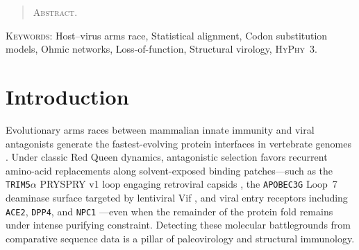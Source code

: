 \documentclass[11pt,letterpaper]{article}
\newcommand{\HyPhyThree}{\textsc{HyPhy~3}\xspace}
\renewenvironment{abstract}{\begin{quote}\small\noindent\textsc{Abstract.}\ }{\end{quote}}
\begin{document}
\begin{abstract}
\end{abstract}

\noindent\small \textsc{Keywords:} Host--virus arms race, Statistical alignment, Codon substitution models, Ohmic networks, Loss-of-function, Structural virology, \HyPhyThree.\normalsize\par
\smallskip
\headerrule

\section{Introduction}

Evolutionary arms races between mammalian innate immunity and viral antagonists generate the fastest-evolving protein interfaces in vertebrate genomes \citep{daugherty2012rules,enard2016viruses}. Under classic Red Queen dynamics, antagonistic selection favors recurrent amino-acid replacements along solvent-exposed binding patches---such as the \texttt{TRIM5}$\alpha$ PRYSPRY v1 loop engaging retroviral capsids \citep{sawyer2005positive,tenthorey2020mutational}, the \texttt{APOBEC3G} Loop~7 deaminase surface targeted by lentiviral Vif \citep{li2023a3g}, and viral entry receptors including \texttt{ACE2}, \texttt{DPP4}, and \texttt{NPC1} \citep{chan2020engineering,wang2013dpp4,ng2015filovirus}---even when the remainder of the protein fold remains under intense purifying constraint. Detecting these molecular battlegrounds from comparative sequence data is a pillar of paleovirology and structural immunology.
\end{document}
